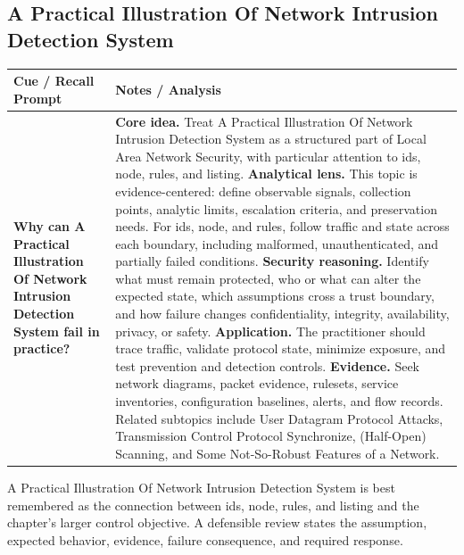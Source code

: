 \documentclass[11pt]{article}
\newcommand{\CornellHeader}{%
\rowcolor{Navy}\color{white}\bfseries Cue / Recall Prompt & \color{white}\bfseries Notes / Analysis\\\hline}
\newcommand{\CornellRow}[2]{%
\cellcolor{CueGray}\RaggedRight\textbf{#1} & \RaggedRight #2\\\hline}
\begin{document}
\subsection*{A Practical Illustration Of Network Intrusion Detection System}
\begin{longtable}{>{\RaggedRight\arraybackslash}p{}|>{\RaggedRight\arraybackslash}p{}}
\CornellHeader
\CornellRow{Why can A Practical Illustration Of Network Intrusion Detection System fail in practice?}{\textbf{Core idea.} Treat A Practical Illustration Of Network Intrusion Detection System as a structured part of Local Area Network Security, with particular attention to ids, node, rules, and listing. \textbf{Analytical lens.} This topic is evidence-centered: define observable signals, collection points, analytic limits, escalation criteria, and preservation needs. For ids, node, and rules, follow traffic and state across each boundary, including malformed, unauthenticated, and partially failed conditions. \textbf{Security reasoning.} Identify what must remain protected, who or what can alter the expected state, which assumptions cross a trust boundary, and how failure changes confidentiality, integrity, availability, privacy, or safety. \textbf{Application.} The practitioner should trace traffic, validate protocol state, minimize exposure, and test prevention and detection controls. \textbf{Evidence.} Seek network diagrams, packet evidence, rulesets, service inventories, configuration baselines, alerts, and flow records. Related subtopics include User Datagram Protocol Attacks, Transmission Control Protocol Synchronize, (Half-Open) Scanning, and Some Not-So-Robust Features of a Network.}
\end{longtable}
\begin{topicsummary}
A Practical Illustration Of Network Intrusion Detection System is best remembered as the connection between ids, node, rules, and listing and the chapter's larger control objective. A defensible review states the assumption, expected behavior, evidence, failure consequence, and required response.
\end{topicsummary}
\end{document}
